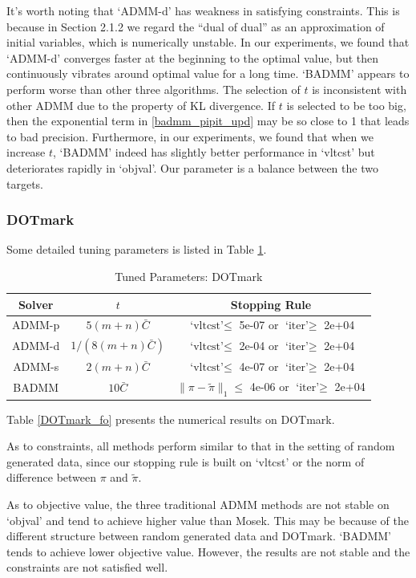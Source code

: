 It's worth noting that `ADMM-d' has weakness in satisfying constraints. This is because in Section 2.1.2 we regard the ``dual of dual'' as an approximation of initial variables, which is numerically unstable. In our experiments, we found that `ADMM-d' converges faster at the beginning to the optimal value, but then continuously vibrates around optimal value for a long time. `BADMM' appears to perform worse than other three algorithms. The selection of $t$ is inconsistent with other ADMM due to the property of KL divergence. If $t$ is selected to be too big, then the exponential term in \ref{badmm_pipit_upd} may be so close to 1 that leads to bad precision. Furthermore, in our experiments, we found that when we increase $t$, `BADMM' indeed has slightly better performance in `vltcst' but deteriorates rapidly in `objval'. Our parameter is a balance between the two targets.

\subsubsection{DOTmark}
Some detailed tuning parameters is listed in Table \ref{param_DOTmark_fo}.
\begin{table}[htbp]
\centering
\caption{Tuned Parameters: DOTmark}
\label{param_DOTmark_fo}
\begin{tabular}{|c|c|c|}
\hline 
Solver & $t$ & Stopping Rule \\
\hline
ADMM-p & $5(m+n)\bar C$ & $\text{`vltcst'}\leqslant$ 5e-07 or $\text{`iter'}\geqslant$ 2e+04 \\\hline
ADMM-d & $1/(8(m+n)\bar C)$ & $\text{`vltcst'}\leqslant$ 2e-04 or $\text{`iter'}\geqslant$ 2e+04 \\\hline
ADMM-s & $2(m+n)\bar C$ & $\text{`vltcst'}\leqslant$ 4e-07 or $\text{`iter'}\geqslant$ 2e+04 \\\hline
BADMM & $10\bar C$ & $\|\pi-\tilde\pi\|_1\leqslant$ 4e-06 or $\text{`iter'}\geqslant$ 2e+04 \\
\hline
\end{tabular}
\end{table}


Table \ref{DOTmark_fo} presents the numerical results on DOTmark.

As to constraints, all methods perform similar to that in the setting of random generated data, since our stopping rule is built on `vltcst' or the norm of difference between $\pi$ and $\tilde\pi$. 

As to objective value, the three traditional ADMM methods are not stable on `objval' and tend to achieve higher value than Mosek. This may be because of the different structure between random generated data and DOTmark. `BADMM' tends to achieve lower objective value. However, the results are not stable and the constraints are not satisfied well.

